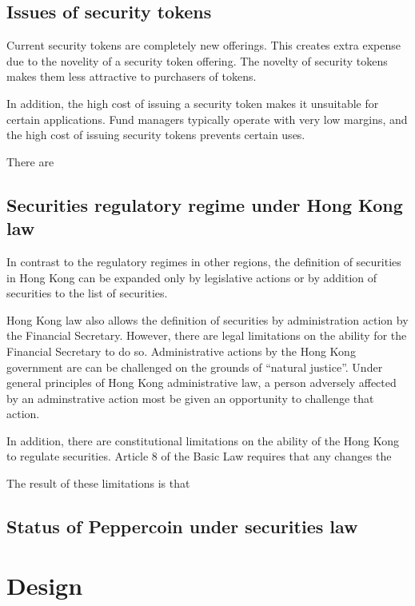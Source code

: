\documentclass[journal]{IEEEtran}
\begin{document}
\subsection{Issues of security tokens}

Current security tokens are completely new offerings.  This creates
extra expense due to the novelity of a security token offering.  The
novelty of security tokens makes them less attractive to purchasers of
tokens.

In addition, the high cost of issuing a security token makes it
unsuitable for certain applications.  Fund managers typically operate
with very low margins, and the high cost of issuing security tokens
prevents certain uses.

There are 

\subsection{Securities regulatory regime under Hong Kong law}

In contrast to the regulatory regimes in other regions, the definition
of securities in Hong Kong can be expanded only by legislative actions
or by addition of securities to the list of securities.

Hong Kong law also allows the definition of securities by
administration action by the Financial Secretary.  However, there are
legal limitations on the ability for the Financial Secretary to do
so.  Administrative actions by the Hong Kong government are can be
challenged on the grounds of ``natural justice''.  Under general
principles of Hong Kong administrative law, a person adversely
affected by an adminstrative action most be given an opportunity to
challenge that action.

In addition, there are constitutional limitations on the ability of
the Hong Kong to regulate securities.  Article 8 of the Basic Law
requires that any changes the 

The result of these limitations is that 

\subsection{Status of Peppercoin under securities law}

\section{Design}
\end{document}
